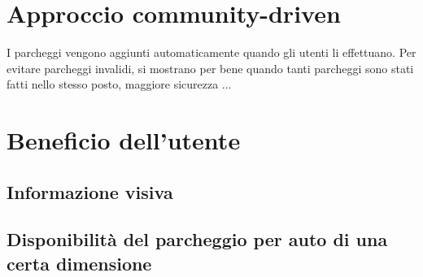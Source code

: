\section{Approccio community-driven}

I parcheggi vengono aggiunti automaticamente quando gli utenti li effettuano. 
Per evitare parcheggi invalidi, si mostrano per bene quando tanti parcheggi sono stati
fatti nello stesso posto, maggiore sicurezza ...

\section{Beneficio dell'utente} 

\subsection{Informazione visiva}

\subsection{Disponibilità del parcheggio per auto di una certa dimensione}
